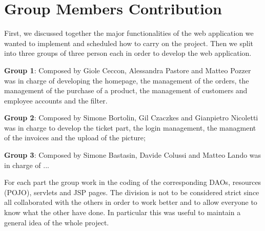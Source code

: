 \section{Group Members Contribution}

First, we discussed together the major functionalities of the web application we wanted to implement and scheduled how to carry on the project.
Then we split into three groups of three person each in order to develop the web application.


\begin{description}
	\item \textbf{Group 1}: Composed by Giole Ceccon, Alessandra Pastore and Matteo Pozzer was in charge of developing the homepage, the management of the orders, the management of the purchase of a product, the management of customers and employee accounts and the filter.
	\item \textbf{Group 2}: Composed by Simone Bortolin, Gil Czaczkes and Gianpietro Nicoletti was in charge to develop the ticket part, the login management, the managment of the invoices and the upload of the picture;
	\item \textbf{Group 3}: Composed by Simone Bastasin, Davide Colussi and Matteo Lando was in charge of ...

For each part the group work in the coding of the corresponding DAOs, resources (POJO), servlets and JSP pages.
The division is not to be considered strict since all collaborated with the others in order to work better and to allow everyone to know what the other have done. In particular this was useful to maintain a general idea of the whole project.

\end{description}